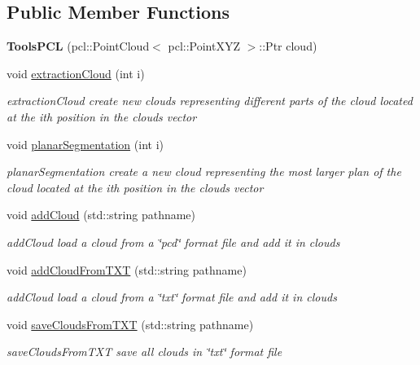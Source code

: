 \subsection*{Public Member Functions}
\begin{DoxyCompactItemize}
\item 
\hypertarget{classToolsPCL_a2917407255ebacff1f473337ec45f235}{{\bfseries Tools\-P\-C\-L} (pcl\-::\-Point\-Cloud$<$ pcl\-::\-Point\-X\-Y\-Z $>$\-::Ptr cloud)}\label{classToolsPCL_a2917407255ebacff1f473337ec45f235}

\item 
void \hyperlink{classToolsPCL_ad99c261b21f228056cadade75f04a533}{extraction\-Cloud} (int i)
\begin{DoxyCompactList}\small\item\em extraction\-Cloud create new clouds representing different parts of the cloud located at the ith position in the clouds vector \end{DoxyCompactList}\item 
void \hyperlink{classToolsPCL_a4461f092363e7c30da969950aa6df1a7}{planar\-Segmentation} (int i)
\begin{DoxyCompactList}\small\item\em planar\-Segmentation create a new cloud representing the most larger plan of the cloud located at the ith position in the clouds vector \end{DoxyCompactList}\item 
void \hyperlink{classToolsPCL_a3e2207bc60d537209ef2540b8e23a2ef}{add\-Cloud} (std\-::string pathname)
\begin{DoxyCompactList}\small\item\em add\-Cloud load a cloud from a \char`\"{}pcd\char`\"{} format file and add it in clouds \end{DoxyCompactList}\item 
void \hyperlink{classToolsPCL_a21cf7571eb47821481550218fe292c1b}{add\-Cloud\-From\-T\-X\-T} (std\-::string pathname)
\begin{DoxyCompactList}\small\item\em add\-Cloud load a cloud from a \char`\"{}txt\char`\"{} format file and add it in clouds \end{DoxyCompactList}\item 
void \hyperlink{classToolsPCL_ac81260d8b719c58f84eaf8674691ad12}{save\-Clouds\-From\-T\-X\-T} (std\-::string pathname)
\begin{DoxyCompactList}\small\item\em save\-Clouds\-From\-T\-X\-T save all clouds in \char`\"{}txt\char`\"{} format file \end{DoxyCompactList}\item 

\end{DoxyCompactItemize}
